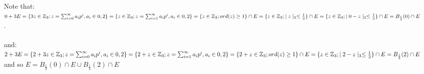 \begin{framed}
Note that:\newline $0 + 3E = \{3z \in \mathbb{Z}_3; z = \sum_{i=0}^\infty a_ip^i, a_i \in {0,2}\} =\\
\{z \in \mathbb{Z}_3; z = \sum_{i=1}^\infty a_ip^i, a_i \in {0,2}\} =\\
\{z \in \mathbb{Z}_3; ord(z) \geq 1 \} \cap E=\\
\{z \in \mathbb{Z}_3; \mid z \mid_3 \leq \frac{1}{3}\} \cap E = \\
\{z \in \mathbb{Z}_3; \mid 0- z \mid_3 \leq \frac{1}{3}\} \cap E = B_{\frac{1}{3}}(0) \cap E$.
\\\\and:\\ 
$2 + 3E = \{2 + 3z \in \mathbb{Z}_3; z = \sum_{i=0}^\infty a_ip^i, a_i \in {0,2}\} =\\
\{2 + z \in \mathbb{Z}_3; z = \sum_{i=1}^\infty a_ip^i, a_i \in {0,2}\} =\\
\{2 + z \in \mathbb{Z}_3; ord(z) \geq 1 \} \cap E=\\
\{z \in \mathbb{Z}_3; \mid 2 - z \mid_3 \leq \frac{1}{3}\} \cap E = \\
B_{\frac{1}{3}}(2) \cap E$
\\ and so $E = B_{\frac{1}{3}}(0)\cap E \cup B_{\frac{1}{3}}(2) \cap E$ 

\end{framed}